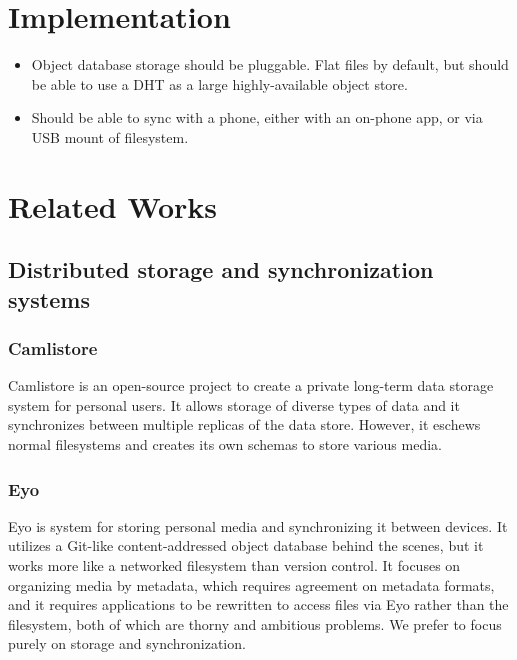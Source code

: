\documentclass[a4paper]{article}
\begin{document}
\section{Implementation}\label{implementation}

\begin{itemize}
  \item
    Object database storage should be pluggable. Flat files by default, but
    should be able to use a DHT as a large highly-available object store.
  \item
    Should be able to sync with a phone, either with an on-phone app, or via USB
    mount of filesystem.
\end{itemize}


\section{Related Works}

\subsection{Distributed storage and synchronization systems}

\subsubsection{Camlistore}

Camlistore \cite{camlistore_homepage} is an open-source project to create a
private long-term data storage system for personal users. It allows storage of
diverse types of data and it synchronizes between multiple replicas of the data
store. However, it eschews normal filesystems and creates its own schemas to
store various media.


\subsubsection{Eyo}

Eyo \cite{Strauss:2011:EDP:2002181.2002216} is system for storing personal media
and synchronizing it between devices. It utilizes a Git-like content-addressed
object database behind the scenes, but it works more like a networked filesystem
than version control. It focuses on organizing media by metadata, which requires
agreement on metadata formats, and it requires applications to be rewritten to
access files via Eyo rather than the filesystem, both of which are thorny and
ambitious problems. We prefer to focus purely on storage and synchronization.
\end{document}
